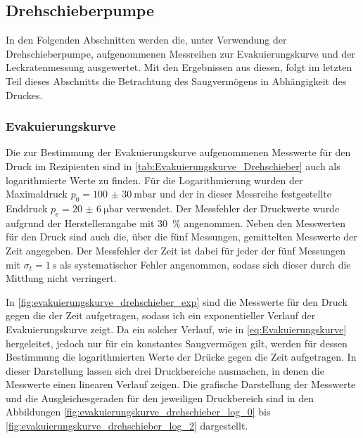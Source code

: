 \subsection{Drehschieberpumpe}
In den Folgenden Abschnitten werden die, unter Verwendung der Drehschieberpumpe, aufgenommenen Messreihen 
zur Evakuierungskurve und der Leckratenmessung ausgewertet. Mit den Ergebnissen aus diesen, folgt im letzten Teil dieses 
Abschnitts die Betrachtung des Saugvermögens in Abhängigkeit des Druckes.

\subsubsection{Evakuierungskurve}
Die zur Bestimmung der Evakuierungskurve aufgenommenen Messwerte für den Druck
im Rezipienten sind in \cref{tab:Evakuierungskurve_Drehschieber} auch als logarithmierte
Werte zu finden. Für die Logarithmierung wurden der Maximaldruck $p_{0} =\SI{100(30)}{\milli\bar} $
und der in dieser Messreihe festgestellte Enddruck $p_{\mathrm{e}} =\SI{20(6)}{\micro\bar}$ verwendet.
Der Messfehler der Druckwerte wurde aufgrund der Herstellerangabe \cite{Pfeifer} mit \SI{30}{\percent} angenommen.
Neben den Messwerten für den Druck sind auch die, über die fünf Messungen, gemittelten Messwerte der Zeit 
angegeben. Der Messfehler der Zeit ist dabei für jeder der fünf Messungen mit $\sigma_{t} = \SI{1}{\s}$ als systematischer
Fehler angenommen, sodass sich dieser durch die Mittlung nicht verringert.



In \cref{fig:evakuierungskurve_drehschieber_exp} sind die Messwerte für den Druck gegen die der Zeit aufgetragen,
sodass ich ein exponentieller Verlauf der Evakuierungskurve zeigt. Da ein solcher Verlauf, wie in 
\eqref{eq:Evakuierungskurve} hergeleitet, jedoch nur für ein konstantes Saugvermögen gilt, werden für dessen Bestimmung die logarithmierten Werte der Drücke gegen die Zeit aufgetragen.
In dieser Darstellung lassen sich drei Druckbereiche ausmachen,
in denen die Messwerte einen linearen Verlauf zeigen. Die grafische Darstellung der Messwerte und die 
Ausgleichesgeraden für den jeweiligen Druckbereich sind in den Abbildungen \ref{fig:evakuierungskurve_drehschieber_log_0} 
bis \ref{fig:evakuierungskurve_drehschieber_log_2} dargestellt.\\



{%

\FloatBarrier}

